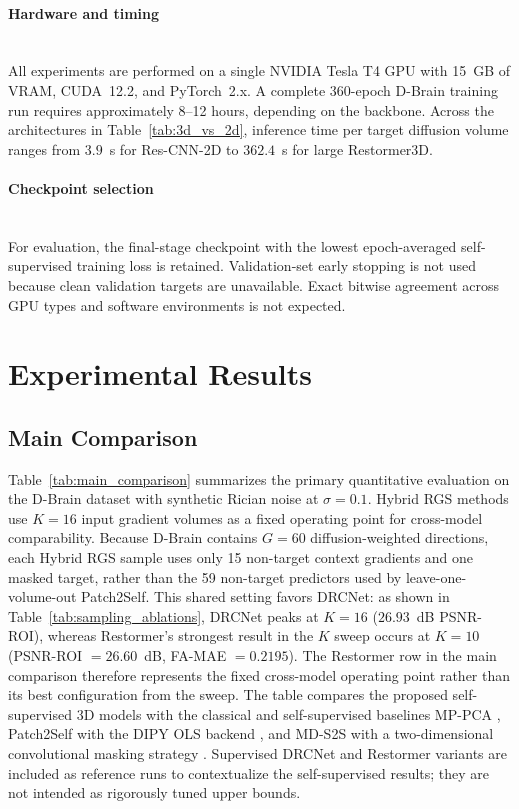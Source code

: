 \documentclass[preprint,12pt]{elsarticle}
\begin{document}
\paragraph{Hardware and timing}\mbox{}\\
All experiments are performed on a single NVIDIA Tesla T4 GPU with 15~GB of VRAM, CUDA~12.2, and PyTorch~2.x. A complete 360-epoch D-Brain training run requires approximately 8--12 hours, depending on the backbone. Across the architectures in Table~\ref{tab:3d_vs_2d}, inference time per target diffusion volume ranges from $3.9$~s for Res-CNN-2D to $362.4$~s for large Restormer3D.

\paragraph{Checkpoint selection}\mbox{}\\
For evaluation, the final-stage checkpoint with the lowest epoch-averaged self-supervised training loss is retained. Validation-set early stopping is not used because clean validation targets are unavailable. Exact bitwise agreement across GPU types and software environments is not expected.

\section{Experimental Results}
\subsection{Main Comparison}
Table~\ref{tab:main_comparison} summarizes the primary quantitative evaluation on the D-Brain dataset with synthetic Rician noise at $\sigma=0.1$. Hybrid RGS methods use $K=16$ input gradient volumes as a fixed operating point for cross-model comparability. Because D-Brain contains $G=60$ diffusion-weighted directions, each Hybrid RGS sample uses only 15 non-target context gradients and one masked target, rather than the 59 non-target predictors used by leave-one-volume-out Patch2Self. This shared setting favors DRCNet: as shown in Table~\ref{tab:sampling_ablations}, DRCNet peaks at $K=16$ ($26.93$~dB PSNR-ROI), whereas Restormer's strongest result in the $K$ sweep occurs at $K=10$ (PSNR-ROI $=26.60$~dB, FA-MAE $=0.2195$). The Restormer row in the main comparison therefore represents the fixed cross-model operating point rather than its best configuration from the sweep. The table compares the proposed self-supervised 3D models with the classical and self-supervised baselines MP-PCA \cite{veraart2016mppca}, Patch2Self with the DIPY OLS backend \cite{fadnavis2020patch2self}, and MD-S2S with a two-dimensional convolutional masking strategy \cite{kang2024mds2s}. Supervised DRCNet and Restormer variants are included as reference runs to contextualize the self-supervised results; they are not intended as rigorously tuned upper bounds.
\end{document}

